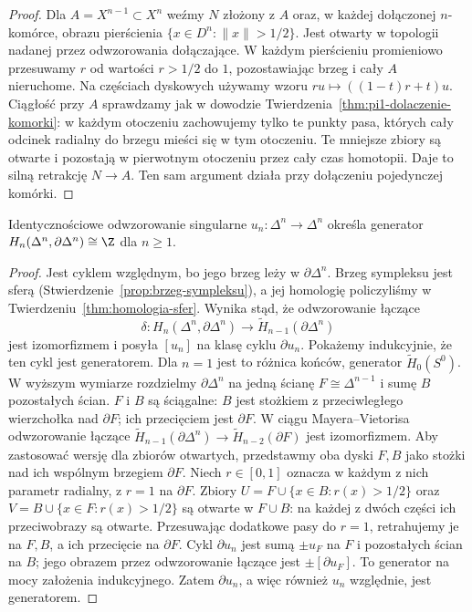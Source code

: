 \begin{proof}
Dla $A=X^{n-1}\subset X^n$
weźmy $N$ złożony z $A$ oraz,
w każdej dołączonej $n$-komórce,
obrazu pierścienia
$\{x\in D^n:\|x\|>1/2\}$.
Jest otwarty w topologii
nadanej przez odwzorowania dołączające.
W każdym pierścieniu promieniowo
przesuwamy $r$ od wartości
$r>1/2$ do $1$, pozostawiając
brzeg i cały $A$ nieruchome.
Na częściach dyskowych używamy wzoru
$ru\mapsto((1-t)r+t)u$. Ciągłość przy $A$ sprawdzamy jak
w dowodzie Twierdzenia~\ref{thm:pi1-dolaczenie-komorki}:
w każdym otoczeniu zachowujemy tylko te punkty pasa, których
cały odcinek radialny do brzegu mieści się w tym otoczeniu.
Te mniejsze zbiory są otwarte i pozostają w pierwotnym otoczeniu
przez cały czas homotopii. Daje to silną retrakcję $N\to A$.
Ten sam argument działa przy dołączeniu pojedynczej komórki.
\end{proof}

\begin{lemat}
\label{lem:orientacja-simpleksu}
Identycznościowe odwzorowanie singularne
$u_n:\Delta^n\to\Delta^n$ określa
generator
$H_n(\Delta^n,\partial\Delta^n)\cong\Z$
dla $n\geq1$.
\end{lemat}
\begin{proof}
Jest cyklem względnym, bo jego
brzeg leży w $\partial\Delta^n$.
Brzeg sympleksu jest sferą
(Stwierdzenie~\ref{prop:brzeg-sympleksu}),
a jej homologię policzyliśmy
w Twierdzeniu~\ref{thm:homologia-sfer}.
Wynika stąd, że odwzorowanie łączące
\[
 \delta:H_n(\Delta^n,\partial\Delta^n)
 \longrightarrow
 \widetilde H_{n-1}(\partial\Delta^n)
 \]
jest izomorfizmem i posyła
$[u_n]$ na klasę cyklu
$\partial u_n$.
Pokażemy indukcyjnie, że ten
cykl jest generatorem.
Dla $n=1$ jest to różnica
końców, generator
$\widetilde H_0(S^0)$.
W wyższym wymiarze rozdzielmy
$\partial\Delta^n$ na jedną
ścianę $F\cong\Delta^{n-1}$
i sumę $B$ pozostałych ścian.
$F$ i $B$ są ściągalne:
$B$ jest stożkiem z przeciwległego
wierzchołka nad $\partial F$;
ich przecięciem jest $\partial F$.
W ciągu Mayera--Vietorisa
odwzorowanie łączące
$\widetilde H_{n-1}(\partial\Delta^n)
\to\widetilde H_{n-2}(\partial F)$
jest izomorfizmem. Aby zastosować wersję dla zbiorów otwartych, przedstawmy
oba dyski $F,B$ jako stożki nad ich wspólnym brzegiem $\partial F$.
Niech $r\in[0,1]$ oznacza w każdym z nich parametr radialny,
z $r=1$ na $\partial F$. Zbiory
$U=F\cup\{x\in B:r(x)>1/2\}$ oraz
$V=B\cup\{x\in F:r(x)>1/2\}$ są otwarte w $F\cup B$:
na każdej z dwóch części ich przeciwobrazy są otwarte.
Przesuwając dodatkowe pasy do $r=1$, retrahujemy je na $F,B$,
a ich przecięcie na $\partial F$.
Cykl $\partial u_n$ jest sumą
$\pm u_F$ na $F$ i pozostałych
ścian na $B$; jego obrazem przez
odwzorowanie łączące jest
$\pm[\partial u_F]$.
To generator na mocy
założenia indukcyjnego.
Zatem $\partial u_n$, a więc
również $u_n$ względnie,
jest generatorem.
\end{proof}

